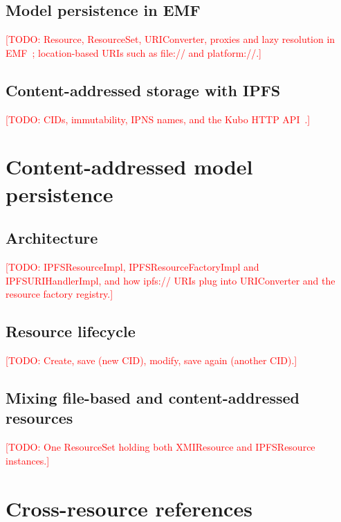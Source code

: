 \documentclass[iicol,pdflatex,sn-mathphys-num]{sn-jnl}
\theoremstyle{thmstylethree}%
\newcommand{\todo}[1]{\textcolor{red}{[TODO: #1]}}
\begin{document}
\subsection{Model persistence in EMF}\label{sec:background-emf}

\todo{Resource, ResourceSet, URIConverter, proxies and lazy resolution in
EMF~\cite{steinberg2008emf}; location-based URIs such as file:// and
platform://.}

\subsection{Content-addressed storage with IPFS}\label{sec:background-ipfs}

\todo{CIDs, immutability, IPNS names, and the Kubo HTTP API~\cite{benet2014ipfs}.}

\section{Content-addressed model persistence}\label{sec:rq1}

\subsection{Architecture}\label{sec:rq1-architecture}

\todo{IPFSResourceImpl, IPFSResourceFactoryImpl and IPFSURIHandlerImpl, and
how ipfs:// URIs plug into URIConverter and the resource factory registry.}

\subsection{Resource lifecycle}\label{sec:rq1-lifecycle}

\todo{Create, save (new CID), modify, save again (another CID).}

\subsection{Mixing file-based and content-addressed resources}\label{sec:rq1-mixed}

\todo{One ResourceSet holding both XMIResource and IPFSResource instances.}

\section{Cross-resource references}\label{sec:rq2}
\end{document}

